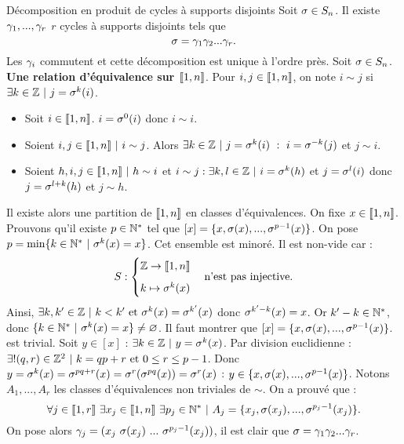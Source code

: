 \documentclass[11pt]{article}
\begin{document}
\begin{thm}{Décomposition en produit de cycles à supports disjoints}{}
    Soit $\sigma\in S_n$. Il existe $\gamma_1,...,\gamma_r$ $r$ cycles à supports disjoints tels que
    \begin{equation*}
        \sigma=\gamma_1\gamma_2...\gamma_r.
    \end{equation*}
    Les $\gamma_i$ commutent et cette décomposition est unique à l'ordre près.
    \tcblower
    Soit $\sigma\in S_n$.\n
    \textbf{Une relation d'équivalence sur $\llbracket1,n\rrbracket$}.\n
    Pour $i,j\in\llbracket1,n\rrbracket$, on note $i\sim j$ si $\exists k \in \mathbb{Z} ~ | ~ j = \sigma^k(i)$.\n
    \begin{itemize}
        \item Soit $i\in\llbracket1,n\rrbracket$. $i=\sigma^0(i)$ donc $i \sim i$.
        \item Soient $i,j\in\llbracket1,n\rrbracket ~ | ~ i \sim j$. Alors $\exists k \in \mathbb{Z} ~ | ~ j = \sigma^k(i) ~ : ~ i = \sigma^{-k}(j)$ et $j \sim i$.
        \item Soient $h,i,j\in\llbracket1,n\rrbracket ~ | ~ h \sim i$ et $i \sim j : \exists k,l \in \mathbb{Z} ~ | ~ i = \sigma^k(h)$ et $j=\sigma^l(i)$ donc $j=\sigma^{l+k}(h)$ et $j \sim h$.
    \end{itemize}
    Il existe alors une partition de $\llbracket1,n\rrbracket$ en classes d'équivalences.\n
    On fixe $x\in\llbracket1,n\rrbracket$.\n
    Prouvons qu'il existe $p\in\mathbb{N}^*$ tel que $[x]=\{x,\sigma(x),...,\sigma^{p-1}(x)\}$.\n
    On pose $p=\min\{k\in\mathbb{N}^* ~ | ~ \sigma^k(x)=x\}$. Cet ensemble est minoré. Il est non-vide car :
    \begin{equation*}
        S : \begin{cases}
            \Z \to \lb1,n\rb\n
            k\mapsto \s^k(x)
        \end{cases}
        \text{n'est pas injective.}
    \end{equation*}
    Ainsi, $\exists k,k' \in \mathbb{Z} ~ | ~ k < k' ~ \text{et} ~ \sigma^k(x)=\sigma^{k'}(x)$ donc $\sigma^{k'-k}(x)=x$.\n
    Or $k'-k\in\mathbb{N}^*$, donc $\{k\in\mathbb{N}^* ~ | ~ \sigma^k(x)=x\}\neq\varnothing$.\n
    Il faut montrer que $[x]=\{x,\sigma(x),...,\sigma^{p-1}(x)\}$.\n
    \fbox{$\supset$} est trivial.\n
    \fbox{$\subset$} Soit $y\in[x]$ : $\exists k \in \mathbb{Z} ~ | ~ y = \sigma^k(x)$.\n
    Par division euclidienne : $\exists!(q,r)\in\mathbb{Z}^2 ~ | ~ k = qp + r ~ \text{et} ~ 0 \leq r \leq p-1$.\n
    Donc $y = \sigma^k(x) = \sigma^{pq+r}(x) = \sigma^r(\sigma^{pq}(x))=\sigma^r(x)$ : $y\in\{x,\sigma(x),...,\sigma^{p-1}(x)\}$.\n
    Notons $A_1,...,A_r$ les classes d'équivalences non triviales de $\sim$. On a prouvé que :
    \begin{equation*}
        \forall j \in \llbracket1,r\rrbracket ~ \exists x_j \in \llbracket 1, n \rrbracket ~ \exists p_j \in \mathbb{N}^* ~ | ~ A_j = \{x_j, \sigma(x_j), ..., \sigma^{p_j-1}(x_j)\}.
    \end{equation*}
    On pose alors $\gamma_j=(x_j~\sigma(x_j)~...~\sigma^{p_j-1}(x_j))$, il est clair que $\sigma=\gamma_1\gamma_2...\gamma_r$.
\end{thm}
\end{document}
